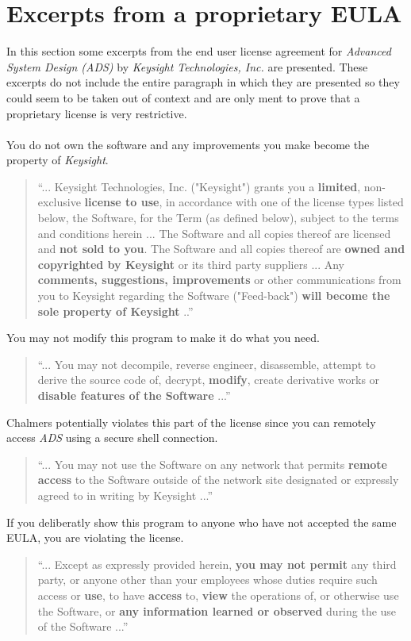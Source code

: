 \documentclass[12pt,a4paper]{article}
\begin{document}
\section{Excerpts from a proprietary EULA}\label{apdx:eula}
In this section some excerpts from the end user license agreement for \textit{Advanced System Design (ADS)} by \textit{Keysight Technologies, Inc.} are presented. These excerpts do not include the entire paragraph in which they are presented so they could seem to be taken out of context and are only ment to prove that a proprietary license is very restrictive.
\\\\
You do not own the software and any improvements you make become the property of \textit{Keysight}.
\begin{quote}
  ``... Keysight Technologies, Inc. ("Keysight") grants you a \textbf{limited}, non-exclusive \textbf{license to use}, in accordance with one of the license types listed below, the Software, for the Term (as defined below), subject to the terms and conditions herein ... The Software and all copies thereof are licensed and \textbf{not sold to you}. The Software and all copies thereof are \textbf{owned and copyrighted by Keysight} or its third party suppliers ... Any \textbf{comments, suggestions, improvements} or other communications from you to Keysight regarding the Software ("Feed-back") \textbf{will become the sole property of Keysight} ..''
\end{quote}
You may not modify this program to make it do what you need.
\begin{quote}
  ``... You may not decompile, reverse engineer, disassemble, attempt to derive the source code of, decrypt, \textbf{modify}, create derivative works or \textbf{disable features of the Software} ...''
\end{quote}
Chalmers potentially violates this part of the license since you can remotely access \textit{ADS} using a secure shell connection.
\begin{quote}
  ``... You may not use the Software on any network that permits \textbf{remote access} to the Software outside of the network site designated or expressly agreed to in writing by Keysight ...''
\end{quote}
If you deliberatly show this program to anyone who have not accepted the same EULA, you are violating the license.
\begin{quote}
  ``... Except as expressly provided herein, \textbf{you may not permit} any third party, or anyone other than your employees whose duties require such access or \textbf{use}, to have \textbf{access} to, \textbf{view} the operations of, or otherwise use the Software, or \textbf{any information learned or observed} during the use of the Software ...''
\end{quote}
\end{document}
